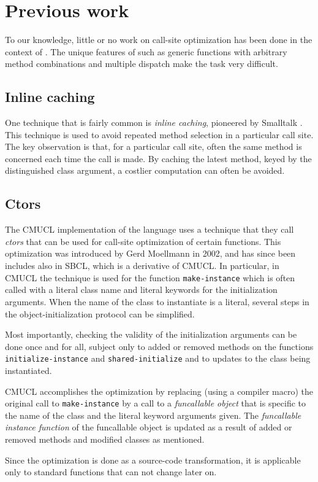 \section{Previous work}

To our knowledge, little or no work on call-site optimization has been
done in the context of \commonlisp{}.  The unique features of
\commonlisp{} such as generic functions with arbitrary method
combinations and multiple dispatch make the task very difficult.

\subsection{Inline caching}

One technique that is fairly common is \emph{inline caching},
pioneered by Smalltalk \cite{Deutsch:1984:ES}.  This technique is used
to avoid repeated method selection in a particular call site.  The key
observation is that, for a particular call site, often the same method
is concerned each time the call is made.  By caching the latest
method, keyed by the distinguished class argument, a costlier
computation can often be avoided.

\subsection{Ctors}
\label{sec-previous-ctors}

The CMUCL implementation of the \commonlisp{} language uses a
technique that they call \emph{ctors} that can be used for call-site
optimization of certain functions.  This optimization was introduced
by Gerd Moellmann in 2002, and has since been includes also in SBCL,
which is a derivative of CMUCL.  In particular, in CMUCL the technique
is used for the function \texttt{make-instance} which is often called
with a literal class name and literal keywords for the initialization
arguments.  When the name of the class to instantiate is a literal,
several steps in the object-initialization protocol can be simplified.

Most importantly, checking the validity of the initialization
arguments can be done once and for all, subject only to added or
removed methods on the functions \texttt{initialize-instance} and
\texttt{shared-initialize} and to updates to the class being
instantiated.

CMUCL accomplishes the optimization by replacing (using a compiler
macro) the original call to \texttt{make-instance} by a call to a
\emph{funcallable object} that is specific to the name of the class
and the literal keyword arguments given.  The \emph{funcallable
  instance function} of the funcallable object is updated as a result
of added or removed methods and modified classes as mentioned.

Since the optimization is done as a source-code transformation, it is
applicable only to standard functions that can not change later on.

